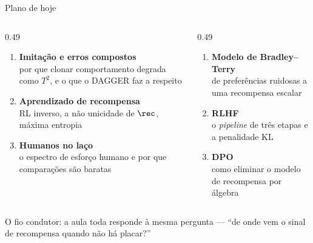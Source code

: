 \documentclass[aspectratio=169, 11pt]{beamer}
\begin{document}
\begin{frame}{Plano de hoje}

  \begin{columns}[T]
  \begin{column}{0.49\textwidth}
    \begin{enumerate}\setlength{\itemsep}{0.5ex}
      \item \textbf{Imitação e erros compostos}\\
        {\small por que clonar comportamento degrada como $T^2$, e o que o
         DAGGER faz a respeito}
      \item \textbf{Aprendizado de recompensa}\\
        {\small RL inverso, a não unicidade de $\rec$, máxima entropia}
      \item \textbf{Humanos no laço}\\
        {\small o espectro de esforço humano e por que comparações são baratas}
    \end{enumerate}
  \end{column}
  \begin{column}{0.49\textwidth}
    \begin{enumerate}\setlength{\itemsep}{0.5ex}
      \setcounter{enumi}{3}
      \item \textbf{Modelo de Bradley--Terry}\\
        {\small de preferências ruidosas a uma recompensa escalar}
      \item \textbf{RLHF}\\
        {\small o \emph{pipeline} de três etapas e a penalidade KL}
      \item \textbf{DPO}\\
        {\small como eliminar o modelo de recompensa por álgebra}
    \end{enumerate}
  \end{column}
  \end{columns}

  \begin{ideiabox}
    O fio condutor: a aula toda responde à mesma pergunta --- ``de onde vem o
    sinal de recompensa quando não há placar?''
  \end{ideiabox}
\end{frame}
\end{document}
